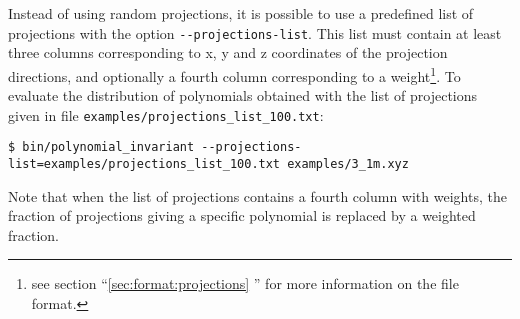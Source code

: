 Instead of using random projections, it is possible to use a predefined list of projections with the option \lstinline{--projections-list}. This list must contain at least three columns corresponding to x, y and z coordinates of the projection directions, and optionally a fourth column corresponding to a weight\footnote{see section ``\ref{sec:format:projections} '' for more information on the file format.}. To evaluate the distribution of polynomials obtained with the list of projections given in file \lstinline{examples/projections_list_100.txt}:
\begin{lstlisting}
$ bin/polynomial_invariant --projections-list=examples/projections_list_100.txt examples/3_1m.xyz
\end{lstlisting}
Note that when the list of projections contains a fourth column with weights, the fraction of projections giving a specific polynomial is replaced by a weighted fraction.

